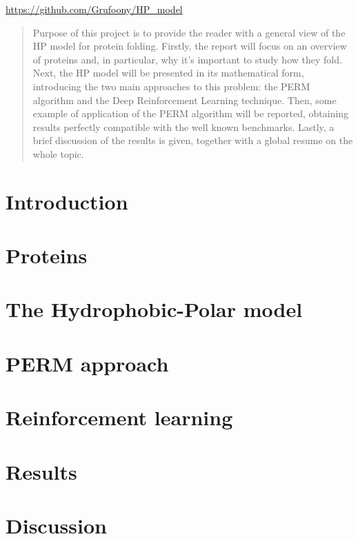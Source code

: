 \documentclass[12pt,a4paper]{article}
\title{}
\author{Gregorio Berselli, Isacco Faglioni}
\date{\today}
\begin{document}
\maketitle
\begin{center}
	\url{https://github.com/Grufoony/HP_model}
\end{center}

\begin{abstract}
Purpose of this project is to provide the reader with a general view of the HP model for protein folding.
Firstly, the report will focus on an overview of proteins and, in particular, why it's important to study how they fold.
Next, the HP model will be presented in its mathematical form, introducing the two main approaches to this problem: the PERM algorithm and the Deep Reinforcement Learning technique.
Then, some example of application of the PERM algorithm will be reported, obtaining results perfectly compatible with the well known benchmarks.
Lastly, a brief discussion of the results is given, together with a global resume on the whole topic.
\end{abstract}
\thispagestyle{empty}

\newpage
\thispagestyle{empty}
\addtocounter{page}{-2}
\mbox{}

\tableofcontents
\pagebreak

\section*{Introduction}

\pagebreak

\section{Proteins}

\pagebreak

\section{The Hydrophobic-Polar model} \label{sec:model}

\pagebreak

\section{PERM approach}

\pagebreak

\section{Reinforcement learning}

\pagebreak

\section{Results}

\pagebreak

\section{Discussion}

\pagebreak

\newpage
\thispagestyle{empty}
\mbox{}

\printbibliography
\end{document}
